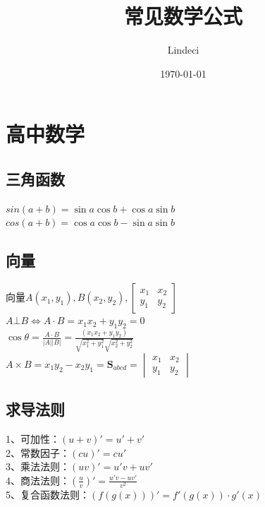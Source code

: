 \documentclass{article}
\title{常见数学公式}
\author{Lindeci}
\date{\today}
\begin{document}
\maketitle
\tableofcontents


\section{高中数学}
\subsection{三角函数}
$sin(a+b) = \sin a \cos b + \cos a \sin b$ \\
$cos(a+b) = \cos a \cos b - \sin a \sin b$ \\
\subsection{向量}
向量$A(x_1,y_1),B(x_2,y_2),
\begin{bmatrix}
x_1 & x_2 \\
y_1 & y_2
\end{bmatrix}
$ \\
$A \bot B \Leftrightarrow A \cdot B = x_1 x_2   + y_1 y_2 = 0$ \\
$ \cos \theta = \frac {A \cdot B} {\vert A \vert \vert B \vert} =\frac {(x_1 x_2 + y_1 y_2)} {\sqrt{x_1^2+y_1^2} \sqrt{x_2^2+y_2^2}}$ \\
$
A \times B = x_1  y_2 - x_2 y_1 = \mathbf{S}_{abcd} = 
\begin{vmatrix} x_1 & x_2 \\
y_1 & y_2 
\end{vmatrix}
$

\subsection{求导法则}
1、可加性：$(u+v)'=u'+v'$   \\
2、常数因子：$(cu)'=cu'$    \\
3、乘法法则：$(uv)'=u'v+uv'$    \\
4、商法法则：$\left(\frac{u}{v}\right)'=\frac{u'v-uv'}{v^2}$    \\
5、复合函数法则：$(f(g(x)))'=f'(g(x))\cdot g'(x)$   \\
\end{document}
